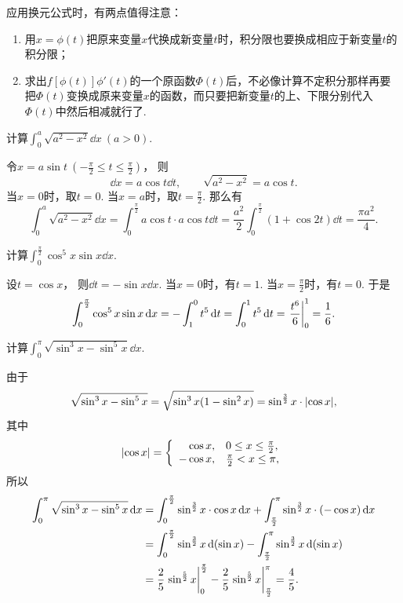 应用换元公式时，有两点值得注意：\begin{enumerate}
\item 用\(x = \phi(t)\)把原来变量\(x\)代换成新变量\(t\)时，积分限也要换成相应于新变量\(t\)的积分限；
\item 求出\(f[\phi(t)] \phi'(t)\)的一个原函数\(\Phi(t)\)后，不必像计算不定积分那样再要把\(\Phi(t)\)变换成原来变量\(x\)的函数，而只要把新变量\(t\)的上、下限分别代入\(\Phi(t)\)中然后相减就行了.
\end{enumerate}

\begin{example}
计算\(\int_0^a \sqrt{a^2-x^2} \dd{x}\ (a > 0)\).
\begin{solution}
令\(x = a \sin t\ (-\frac\pi2 \leq t \leq \frac\pi2)\)，
则\[
	\dd{x} = a \cos t \dd{t}, \qquad
	\sqrt{a^2-x^2} = a \cos t.
\]
当\(x = 0\)时，取\(t = 0\).
当\(x = a\)时，取\(t = \frac{\pi}{2}\).
那么有\[
	\int_0^a \sqrt{a^2-x^2} \dd{x}
	= \int_0^{\frac{\pi}{2}} a \cos t \cdot a \cos t \dd{t}
	= \frac{a^2}{2} \int_0^{\frac{\pi}{2}} (1+\cos 2 t) \dd{t}
	= \frac{\pi a^2}{4}.
\]
\end{solution}
\end{example}

\begin{example}
计算\(\int_0^{\frac\pi2} \cos^5 x \sin x \dd{x}\).
\begin{solution}
设\(t = \cos x\)，
则\(\dd{t} = -\sin x \dd{x}\).
当\(x=0\)时，有\(t=1\).
当\(x=\frac\pi2\)时，有\(t=0\).
于是\[
	\int_0^{\frac\pi2} \cos^5 x \sin x \dd{x}
	= -\int_1^0 t^5 \dd{t}
	= \int_0^1 t^5 \dd{t}
	= \eval{\frac{t^6}6}_0^1
	= \frac16.
\]
\end{solution}
\end{example}

\begin{example}
计算\(\int_0^\pi \sqrt{\sin^3 x - \sin^5 x} \dd{x}\).
\begin{solution}
由于\[
	\sqrt{\sin^3 x - \sin^5 x}
	= \sqrt{\sin^3 x (1 - \sin^2 x)}
	= \sin^{\frac32} x \cdot \abs{\cos x},
\]
其中\[
	\abs{\cos x} = \left\{ \begin{array}{rl}
		\cos x, & 0 \leq x \leq \frac\pi2, \\
		-\cos x, & \frac\pi2 < x \leq \pi,
	\end{array} \right.
\]
所以\begin{align*}
	\int_0^\pi \sqrt{\sin^3 x - \sin^5 x} \dd{x}
	&= \int_0^{\frac\pi2} \sin^{\frac32} x \cdot \cos x \dd{x}
		+ \int_{\frac\pi2}^\pi \sin^{\frac32} x \cdot (-\cos x) \dd{x} \\
	&= \int_0^{\frac\pi2} \sin^{\frac32} x \dd(\sin x)
		- \int_{\frac\pi2}^\pi \sin^{\frac32} x \dd(\sin x) \\
	&= \frac25 \eval{\sin^{\frac52} x}_0^{\frac\pi2}
		- \frac25 \eval{\sin^{\frac52} x}_{\frac\pi2}^\pi
	= \frac45.
\end{align*}
\end{solution}
\end{example}

